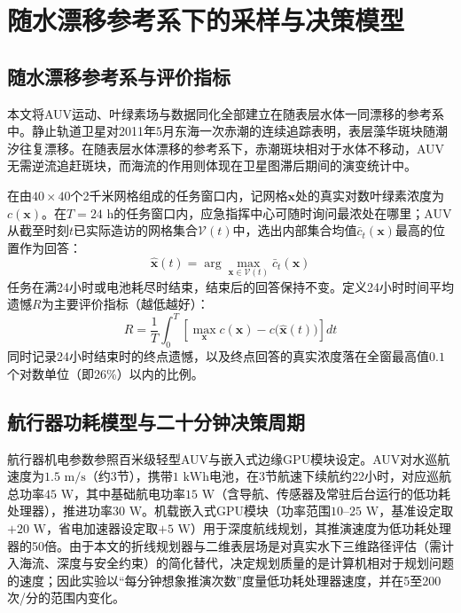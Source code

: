 \section{随水漂移参考系下的采样与决策模型}

\subsection{随水漂移参考系与评价指标}

本文将AUV运动、叶绿素场与数据同化全部建立在随表层水体一同漂移的参考系中。静止轨道卫星对2011年5月东海一次赤潮的连续追踪表明，表层藻华斑块随潮汐往复漂移\cite{lou2014diurnal}。在随表层水体漂移的参考系下，赤潮斑块相对于水体不移动，AUV无需逆流追赶斑块，而海流的作用则体现在卫星图滞后期间的演变统计中。

在由$40\times 40$个2千米网格组成的任务窗口内，记网格$\mathbf{x}$处的真实对数叶绿素浓度为$c(\mathbf{x})$。在$T=24\text{ h}$的任务窗口内，应急指挥中心可随时询问最浓处在哪里；AUV从截至时刻$t$已实际造访的网格集合$\mathcal{V}(t)$中，选出内部集合均值$\bar{c}_t(\mathbf{x})$最高的位置作为回答：
\begin{equation}
  \hat{\mathbf{x}}(t) = \arg\max_{\mathbf{x}\in\mathcal{V}(t)} \bar{c}_t(\mathbf{x})
  \label{eq:answer}
\end{equation}
任务在满24小时或电池耗尽时结束，结束后的回答保持不变。定义24小时时间平均遗憾$R$为主要评价指标（越低越好）：
\begin{equation}
  R = \frac{1}{T}\int_0^T \left[\max_{\mathbf{x}} c(\mathbf{x}) - c\big(\hat{\mathbf{x}}(t)\big)\right] dt
  \label{eq:regret}
\end{equation}
同时记录24小时结束时的终点遗憾，以及终点回答的真实浓度落在全窗最高值$0.1$个对数单位（即26\%）以内的比例。

\subsection{航行器功耗模型与二十分钟决策周期}

航行器机电参数参照百米级轻型AUV\cite{remus100}与嵌入式边缘GPU模块\cite{jetsonorinnx}设定。AUV对水巡航速度为$1.5\text{ m/s}$（约3节），携带$1\text{ kWh}$电池，在3节航速下续航约22小时，对应巡航总功率$45\text{ W}$，其中基础航电功率$15\text{ W}$（含导航、传感器及常驻后台运行的低功耗处理器），推进功率$30\text{ W}$。机载嵌入式GPU模块（功率范围$10\text{--}25\text{ W}$，基准设定取$+20\text{ W}$，省电加速器设定取$+5\text{ W}$）用于深度航线规划，其推演速度为低功耗处理器的50倍。由于本文的折线规划器与二维表层场是对真实水下三维路径评估（需计入海流、深度与安全约束）的简化替代，决定规划质量的是计算机相对于规划问题的速度；因此实验以“每分钟想象推演次数”度量低功耗处理器速度，并在5至200次/分的范围内变化。

